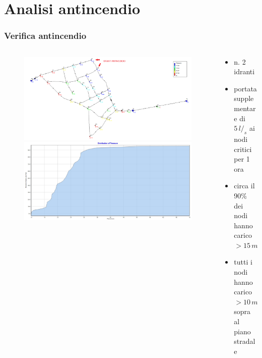 \documentclass{beamer}
\newcommand{\nologo}{\setbeamertemplate{logo}{}}
\begin{document}
{\nologo
\section{Analisi antincendio}
\begin{frame}
	\frametitle{Verifica antincendio}
	\begin{columns}
		\begin{column}{.7\textwidth}
				\begin{figure}
					\centering
					\begin{overprint}
						\includegraphics[width=\linewidth]{images/pressure_antincendio}
						\onslide<2>\includegraphics[width=\linewidth]{images/pressure_distribution_antincendio}
					\end{overprint}
				\end{figure}
		\end{column}
%
		\begin{column}{.3\textwidth}
			\begin{itemize}
				\item n. 2 idranti
				\item portata supplementare di $5\,l/_s$ ai nodi critici per 1 ora
				\onslide<2>\item circa il 90\% dei nodi hanno carico $> 15\,m$
				\item tutti i nodi hanno carico $>10\,m$ sopra al piano stradale
			\end{itemize}
		\end{column}
	\end{columns}
\end{frame}
}
%
%
%
\end{document}
